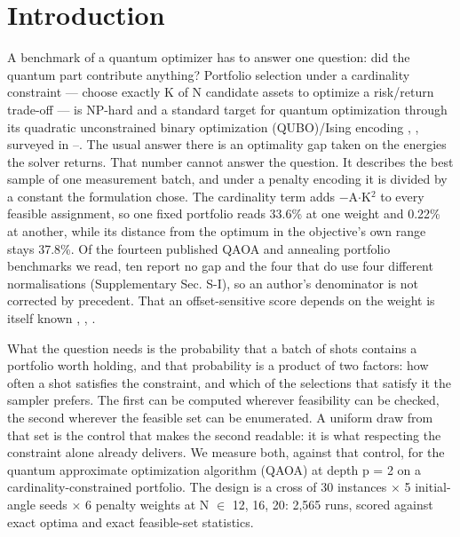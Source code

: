 \documentclass{ieeeaccess}
\begin{document}
\titlepgskip=-15pt

\maketitle


\section{Introduction}


A benchmark of a quantum optimizer has to answer one question: did the quantum part contribute anything? Portfolio selection under a cardinality constraint --- choose exactly K of N candidate assets to optimize a risk/return trade-off \cite{ref1} --- is NP-hard \cite{ref2} and a standard target for quantum optimization through its quadratic unconstrained binary optimization (QUBO)/Ising encoding \cite{ref3}, \cite{ref4}, surveyed in \cite{ref5}--\cite{ref7}. The usual answer there is an optimality gap taken on the energies the solver returns. That number cannot answer the question. It describes the best sample of one measurement batch, and under a penalty encoding it is divided by a constant the formulation chose. The cardinality term adds $-$A$\cdot$K$^{2}$ to every feasible assignment, so one fixed portfolio reads 33.6\% at one weight and 0.22\% at another, while its distance from the optimum in the objective's own range stays 37.8\%. Of the fourteen published QAOA and annealing portfolio benchmarks we read, ten report no gap and the four that do use four different normalisations (Supplementary Sec. S-I), so an author's denominator is not corrected by precedent. That an offset-sensitive score depends on the weight is itself known \cite{ref9}, \cite{ref10}, \cite{ref11}.


What the question needs is the probability that a batch of shots contains a portfolio worth holding, and that probability is a product of two factors: how often a shot satisfies the constraint, and which of the selections that satisfy it the sampler prefers. The first can be computed wherever feasibility can be checked, the second wherever the feasible set can be enumerated. A uniform draw from that set is the control that makes the second readable: it is what respecting the constraint alone already delivers. We measure both, against that control, for the quantum approximate optimization algorithm (QAOA) at depth p = 2 on a cardinality-constrained portfolio. The design is a cross of 30 instances $\times$ 5 initial-angle seeds $\times$ 6 penalty weights at N $\in$ {12, 16, 20}: 2,565 runs, scored against exact optima and exact feasible-set statistics.
\end{document}
